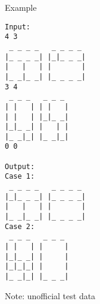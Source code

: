 Example
\begin{verbatim}
Input:
4 3
 _ _ _ _   _ _ _ _ 
|_ _ _ _| |_|_ _ _|
|   |   | |       |
|_ _|_ _| |_ _ _ _|
3 4
 _ _ _   _ _ _ 
| |   | | |   |
| |   | |_|_ _|
|_|_ _| |   | |
|_ _|_| |_ _|_|
0 0

Output:
Case 1:
 _ _ _ _   _ _ _ _ 
|_|_ _ _| |_ _ _ _|
|   |   | |       |
|_ _|_ _| |_ _ _ _|
Case 2:
 _ _ _   _ _ _ 
| |   | |     |
|_|_ _| |     |
|_|_|_| |     |
|_ _|_| |_ _ _|

\end{verbatim}

Note: unofficial test data